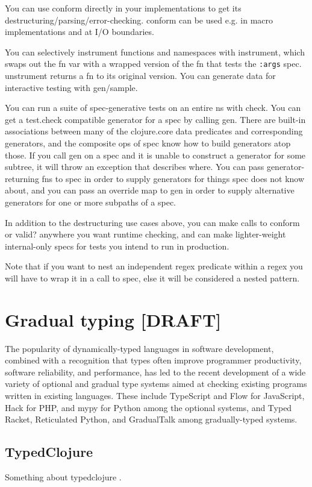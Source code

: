 You can use conform directly in your implementations to get its
destructuring/parsing/error-checking. conform can be used e.g. in macro
implementations and at I/O boundaries.

You can selectively instrument functions and namespaces with instrument, which
swaps out the fn var with a wrapped version of the fn that tests the
\texttt{:args} spec. unstrument returns a fn to its original version. You can
generate data for interactive testing with gen/sample.

You can run a suite of spec-generative tests on an entire ns with check. You can
get a test.check compatible generator for a spec by calling gen. There are
built-in associations between many of the clojure.core data predicates and
corresponding generators, and the composite ops of spec know how to build
generators atop those. If you call gen on a spec and it is unable to construct a
generator for some subtree, it will throw an exception that describes where. You
can pass generator-returning fns to spec in order to supply generators for
things spec does not know about, and you can pass an override map to gen in
order to supply alternative generators for one or more subpaths of a spec.

In addition to the destructuring use cases above, you can make calls to conform
or valid? anywhere you want runtime checking, and can make lighter-weight
internal-only specs for tests you intend to run in production.

Note that if you want to nest an independent regex predicate within a regex you
will have to wrap it in a call to spec, else it will be considered a nested
pattern.





\section{Gradual typing [DRAFT]}
The popularity of dynamically-typed languages in software development, combined
with a recognition that types often improve programmer productivity, software
reliability, and performance, has led to the recent development of a wide
variety of optional and gradual type systems aimed at checking existing programs
written in existing languages. These include TypeScript and Flow for JavaScript,
Hack for PHP, and mypy for Python among the optional systems, and Typed Racket,
Reticulated Python, and GradualTalk among gradually-typed systems.

\subsection{TypedClojure}
Something about typedclojure \cite{bonnaire2016practical}.

